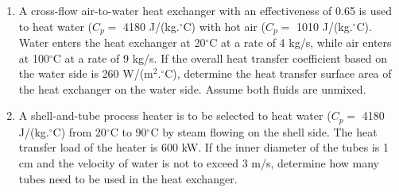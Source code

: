\documentclass[12pts,a4paper,amsmath,amssymb,floatfix]{article}%
\begin{document}
\begin{enumerate}[label=\bfseries Problem \arabic*:]
\item\label{Problem:HE_Cegel13_89} A cross-flow air-to-water heat exchanger with an effectiveness of 0.65 is used to heat water ($C_{p}=$ 4180 J/(kg.$^{\circ}$C) with hot air  ($C_{p}=$ 1010 J/(kg.$^{\circ}$C). Water enters the heat exchanger at 20$^{\circ}$C at a rate of 4 kg/s, while air enters at 100$^{\circ}$C at a rate of 9 kg/s. If the overall heat transfer coefficient based on the water side is 260 W/(m$^{2}.^{\circ}$C), determine the heat transfer surface area of the heat exchanger on the water side. Assume both fluids are unmixed.


\item\label{Problem:HE_Cegel13_107} A shell-and-tube process heater is to be selected to heat water ($C_{p}=$ 4180 J/(kg.$^{\circ}$C) from 20$^{\circ}$C to 90$^{\circ}$C by steam flowing on the shell side. The heat transfer load of the heater is 600 kW. If the inner diameter of the tubes is 1 cm and the velocity of water is not to exceed 3 m/s, determine how many tubes need to be used in the heat exchanger.


\end{enumerate}



\clearpage

%
\end{document}
